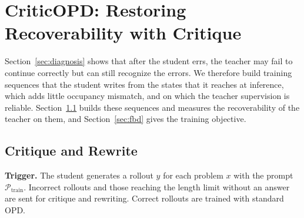 
\section{CriticOPD: Restoring Recoverability with Critique}
\label{sec:method}

Section~\ref{sec:diagnosis} shows that after the student errs, the teacher may fail to continue correctly but can still recognize the errors. We therefore build training sequences that the student writes from the states that it reaches at inference, which adds little occupancy mismatch, and on which the teacher supervision is reliable. Section~\ref{sec:rewrite} builds these sequences and measures the recoverability of the teacher on them, and Section~\ref{sec:fbd} gives the training objective.

\subsection{Critique and Rewrite}
\label{sec:rewrite}

\noindent\textbf{Trigger.}
The student generates a rollout $y$ for each problem $x$ with the prompt $\mathcal{P}_{\text{train}}$. Incorrect rollouts and those reaching the length limit without an answer are sent for critique and rewriting. Correct rollouts are trained with standard OPD.

